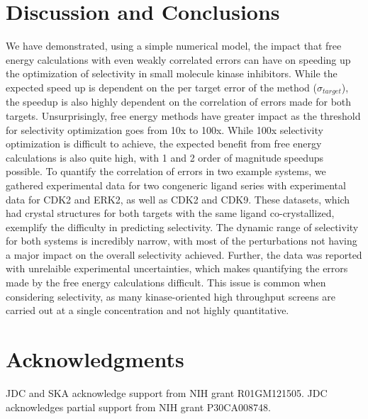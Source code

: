 \documentclass[9pt,lineno]{elife-modified} %
\begin{document}
\section{Discussion and Conclusions}
We have demonstrated, using a simple numerical model, the impact that free energy calculations with even weakly correlated errors can have on speeding up the optimization of selectivity in small molecule kinase inhibitors. While the expected speed up is dependent on the per target error of the method ($\sigma_{target}$), the speedup is also highly dependent on the correlation of errors made for both targets. Unsurprisingly, free energy methods have greater impact as the threshold for selectivity optimization goes from 10x to 100x. While 100x selectivity optimization is difficult to achieve, the expected benefit from free energy calculations is also quite high, with 1 and 2 order of magnitude speedups possible. 
To quantify the correlation of errors in two example systems, we gathered experimental data for two congeneric ligand series with experimental data for CDK2 and ERK2, as well as CDK2 and CDK9. These datasets, which had crystal structures for both targets with the same ligand co-crystallized, exemplify the difficulty in predicting selectivity. The dynamic range of selectivity for both systems is incredibly narrow, with most of the perturbations not having a major impact on the overall selectivity achieved. Further, the data was reported with unrelaible experimental uncertainties, which makes quantifying the errors made by the free energy calculations difficult. This issue is common when considering selectivity, as many kinase-oriented high throughput screens are carried out at a single concentration and not highly quantitative. 

%
\newpage
%




\section{Acknowledgments}
JDC and SKA acknowledge support from NIH grant R01GM121505.
JDC acknowledges partial support from NIH grant P30CA008748.
\end{document}
